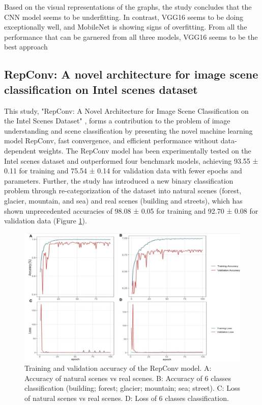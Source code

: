 \documentclass[conference]{IEEEtran}
\begin{document}
Based on the visual representations of the graphs, the study concludes that the CNN model seems to be underfitting. In contrast, VGG16 seems to be doing exceptionally well, and MobileNet is showing signs of overfitting. From all the performance that can be garnered from all three models, VGG16 seems to be the best approach

\subsection{RepConv: A novel architecture for image scene classification on Intel scenes dataset}

This study, "RepConv: A Novel Architecture for Image Scene Classification on the Intel Scenes Dataset" \cite{article:Soudy:2022},  forms a contribution to the problem of image understanding and scene classification by presenting the novel machine learning model RepConv, fast convergence, and efficient performance without data-dependent weights. The RepConv model has been experimentally tested on the Intel scenes dataset and outperformed four benchmark models, achieving 93.55 ± 0.11 for training and 75.54 ± 0.14 for validation data with fewer epochs and parameters. Further, the study has introduced a new binary classification problem through re-categorization of the dataset into natural scenes (forest, glacier, mountain, and sea) and real scenes (building and streets), which has shown unprecedented accuracies of 98.08 ± 0.05 for training and 92.70 ± 0.08 for validation data (Figure \ref{fig:repConv}).

\begin{figure}[H]
    \centering
    \includegraphics[width=0.8\linewidth]{images/stateOfTheArt/repconv.png}
    \caption{Training and validation accuracy of the RepConv model. A: Accuracy of natural scenes vs real scenes. B: Accuracy of 6 classes classification (building; forest; glacier; mountain; sea; street). C: Loss of natural scenes vs real scenes. D: Loss of 6 classes classification. \cite{article:Soudy:2022}}
    \label{fig:repConv}
\end{figure}
\end{document}
